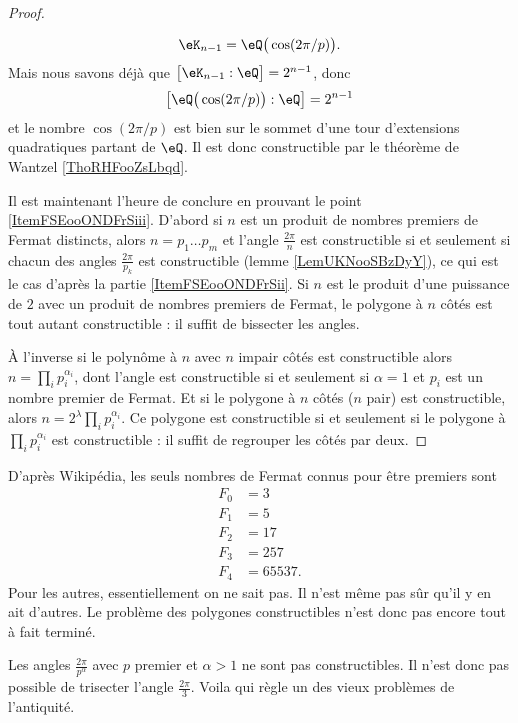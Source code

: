\begin{proof}
\begin{subproof}
\begin{subproof}
\begin{equation}
                            \eK_{n-1}=\eQ\big( \cos(2\pi/p) \big).
                        \end{equation}
                        Mais nous savons déjà que \( \big[ \eK_{n-1}:\eQ \big]=2^{n-1}\), donc
                        \begin{equation}
                            \big[ \eQ\big( \cos(2\pi/p) \big):\eQ \big]=2^{n-1}
                        \end{equation}
                        et le nombre \( \cos(2\pi/p)\) est bien sur le sommet d'une tour d'extensions quadratiques partant de \( \eQ\). Il est donc constructible par le théorème de Wantzel \ref{ThoRHFooZsLbqd}.
            \end{subproof}
    \end{subproof}

    Il est maintenant l'heure de conclure en prouvant le point \ref{ItemFSEooONDFrSiii}. D'abord si \( n\) est un produit de nombres premiers de Fermat distincts, alors \( n=p_1\ldots p_m\) et l'angle \( \frac{ 2\pi }{ n }\) est constructible si et seulement si chacun des angles \( \frac{ 2\pi }{ p_k }\) est constructible (lemme \ref{LemUKNooSBzDyY}), ce qui est le cas d'après la partie \ref{ItemFSEooONDFrSii}. Si \( n\) est le produit d'une puissance de \( 2\) avec un produit de nombres premiers de Fermat, le polygone à \( n\) côtés est tout autant constructible : il suffit de bissecter les angles.

    À l'inverse si le polynôme à \( n\) avec \( n\) impair côtés est constructible alors \( n=\prod_ip_i^{\alpha_i}\), dont l'angle est constructible si et seulement si \( \alpha=1\) et \( p_i\) est un nombre premier de Fermat. Et si le polygone à \( n\) côtés (\( n\) pair) est constructible, alors \( n=2^{\lambda}\prod_ip_i^{\alpha_i}\). Ce polygone est constructible si et seulement si le polygone à \( \prod_ip_i^{\alpha_i}\) est constructible : il suffit de regrouper les côtés par deux.

\end{proof}

\begin{remark}
    D'après Wikipédia\cite{PLQooFQtjyR}, les seuls nombres de Fermat connus pour être premiers sont
    \begin{subequations}
        \begin{align}
            F_0&=3\\
            F_1&=5\\
            F_2&=17\\
            F_3&=257\\
            F_4&=65537.
        \end{align}
    \end{subequations}
    Pour les autres, essentiellement on ne sait pas. Il n'est même pas sûr qu'il y en ait d'autres. Le problème des polygones constructibles n'est donc pas encore tout à fait terminé.
\end{remark}

\begin{remark}
    Les angles \( \frac{ 2\pi }{ p^{\alpha} }\) avec \( p\) premier et \( \alpha>1\) ne sont pas constructibles. Il n'est donc pas possible de trisecter l'angle \( \frac{ 2\pi }{ 3 }\). Voila qui règle un des vieux problèmes de l'antiquité.
\end{remark}
